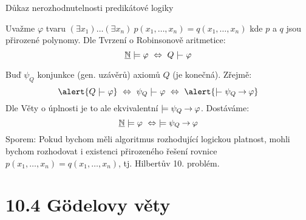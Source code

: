 \documentclass{beamer}
\begin{document}
\begin{frame}{Důkaz nerozhodnutelnosti predikátové logiky}

    Uvažme $\varphi$ tvaru $(\exists x_1)\dots(\exists x_n)\ p(x_1,\dots,x_n)=q(x_1,\dots,x_n)$ 
    kde $p$ a $q$ jsou přirozené polynomy. Dle Tvrzení o Robinsonově aritmetice:
    $$
    \underline{\mathbb N}\models \varphi\ \Leftrightarrow\  Q\proves \varphi
    $$

    Buď $\psi_Q$ konjunkce (gen. uzávěrů) axiomů $Q$ (je konečná). Zřejmě: 
    $$
    \alert{Q\proves\varphi}\ \Leftrightarrow\ \psi_Q\proves\varphi\ \Leftrightarrow\ \alert{\proves\psi_Q\limplies\varphi}
    $$
    Dle Věty o úplnosti je to ale ekvivalentní \alert{$\models\psi_Q\mathbin{\rightarrow}\varphi$}. Dostáváme:
    $$
    \underline{\mathbb N}\models \varphi\ \Leftrightarrow\ \models \psi_Q\mathbin{\rightarrow}\varphi
    $$
    \alert{Sporem:} Pokud bychom měli algoritmus rozhodující logickou platnost, mohli bychom rozhodovat i existenci přirozeného řešení rovnice $p(x_1,\dots,x_n)=q(x_1,\dots,x_n)$, tj. Hilbertův 10. problém.\hfill\qedsymbol


\end{frame}


\section{10.4 Gödelovy věty}
\end{document}
